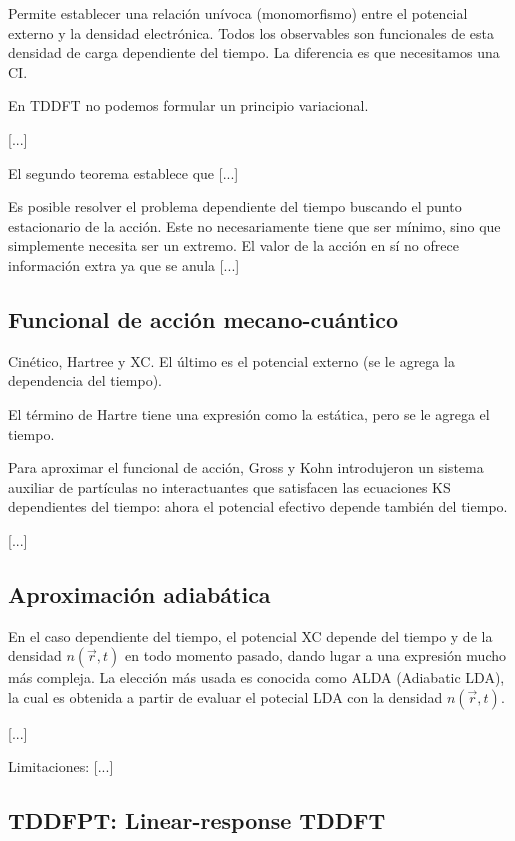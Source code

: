   Permite establecer una relación unívoca (monomorfismo) entre el potencial externo y la densidad electrónica. Todos los observables son funcionales de esta densidad de carga dependiente del tiempo. La diferencia es que necesitamos una CI.

  En TDDFT no podemos formular un principio variacional.

  [...]

  El segundo teorema establece que [...]

  Es posible resolver el problema dependiente del tiempo buscando el punto estacionario de la acción. Este no necesariamente tiene que ser mínimo, sino que simplemente necesita ser un extremo. El valor de la acción en sí no ofrece información extra ya que se anula [...]

\subsection{Funcional de acción mecano-cuántico}

  Cinético, Hartree y XC. El último es el potencial externo (se le agrega la dependencia del tiempo).

  El término de Hartre tiene una expresión como la estática, pero se le agrega el tiempo.

  Para aproximar el funcional de acción, Gross y Kohn introdujeron un sistema auxiliar de partículas no interactuantes que satisfacen las ecuaciones KS dependientes del tiempo: ahora el potencial efectivo depende también del tiempo.

  [...]



\subsection{Aproximación adiabática}

  En el caso dependiente del tiempo, el potencial XC depende del tiempo y de la densidad $n (\vec{r}, t)$ en todo momento pasado, dando lugar a una expresión mucho más compleja. La elección más usada es conocida como ALDA (Adiabatic LDA), la cual es obtenida a partir de evaluar el potecial LDA con la densidad $n (\vec{r}, t)$.

  [...]

  Limitaciones: [...]

\subsection{TDDFPT: Linear-response TDDFT}

